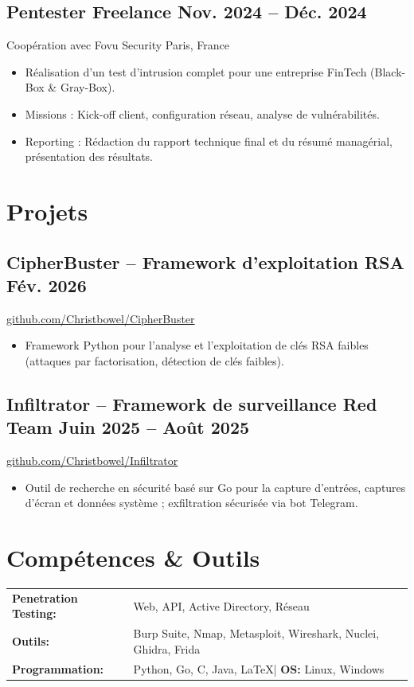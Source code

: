 \documentclass[a4paper,10pt]{article}
\newcommand{\subtext}[1]{#1\par\vspace{-0.2cm}}
\newcommand{\hskills}[1]{\textbf{#1}}
\newenvironment{zitemize}{
    \begin{itemize}[leftmargin=*, labelsep=0.5em, itemsep=0pt, parsep=1pt]
}{\end{itemize}\vspace{-0.2cm}}
\begin{document}
\subsection*{Pentester Freelance \hfill Nov. 2024 -- Déc. 2024} 
\subtext{Coopération avec Fovu Security \hfill Paris, France} 
\begin{zitemize}
    \item Réalisation d'un test d'intrusion complet pour une entreprise FinTech (Black-Box \& Gray-Box).
    \item Missions : Kick-off client, configuration réseau, analyse de vulnérabilités.
    \item Reporting : Rédaction du rapport technique final et du résumé managérial, présentation des résultats.
\end{zitemize}

\section{Projets}
\subsection*{CipherBuster -- Framework d'exploitation RSA \hfill Fév. 2026}
\subtext{\href{https://github.com/Christbowel/CipherBuster}{github.com/Christbowel/CipherBuster}}
\begin{zitemize}
    \item Framework Python pour l'analyse et l'exploitation de clés RSA faibles (attaques par factorisation, détection de clés faibles).
\end{zitemize}

\subsection*{Infiltrator -- Framework de surveillance Red Team \hfill Juin 2025 -- Août 2025}
\subtext{\href{https://github.com/Christbowel/Infiltrator}{github.com/Christbowel/Infiltrator}}
\begin{zitemize}
    \item Outil de recherche en sécurité basé sur Go pour la capture d'entrées, captures d'écran et données système ; exfiltration sécurisée via bot Telegram.
\end{zitemize}

\section{Compétences \& Outils}
\begin{tabular}{>{\raggedright\arraybackslash}p{10em} p{38em}}
    \hskills{Penetration Testing:} & Web, API, Active Directory, Réseau \\
    \hskills{Outils:} & Burp Suite, Nmap, Metasploit, Wireshark, Nuclei, Ghidra, Frida \\
    \hskills{Programmation:} & Python, Go, C, Java, \LaTeX \quad | \quad \textbf{OS:} Linux, Windows \\
\end{tabular}
\end{document}
